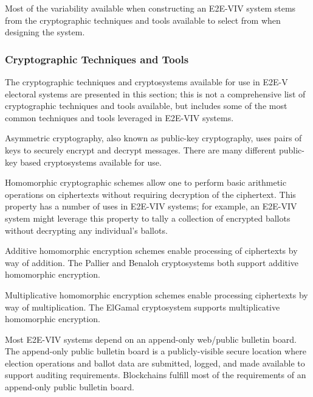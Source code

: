 Most of the variability available when constructing an E2E-VIV system stems from
the cryptographic techniques and tools available to select from when designing
the system.

\subsubsection{Cryptographic Techniques and Tools}
The cryptographic techniques and cryptosystems available for use in E2E-V
electoral systems are presented in this section; this is not a comprehensive
list of cryptographic techniques and tools available, but includes some of the
most common techniques and tools leveraged in E2E-VIV systems.

Asymmetric cryptography, also known as public-key cryptography, uses pairs of
keys to securely encrypt and decrypt messages. There are many different
public-key based cryptosystems available for use.

Homomorphic cryptographic schemes allow one to perform basic arithmetic
operations on ciphertexts without requiring decryption of the ciphertext. This
property has a number of uses in E2E-VIV systems; for example, an E2E-VIV system
might leverage this property to tally a collection of encrypted ballots without
decrypting any individual's ballots.

Additive homomorphic encryption schemes enable processing of ciphertexts by way
of addition. The Pallier and Benaloh cryptosystems both support additive
homomorphic encryption.\cite{helios}

Multiplicative homomorphic encryption schemes enable processing ciphertexts by
way of multiplication. The ElGamal cryptosystem supports multiplicative
homomorphic encryption.

Most E2E-VIV systems depend on an append-only web/public bulletin
board.\cite{bulletin-board} The append-only public bulletin board is a
publicly-visible secure location where election operations and ballot data are
submitted, logged, and made available to support auditing
requirements.\cite{e2e-viv,helios,almost-correct-mixing,pretty-good-democracy,mix-networks,vector-ballot-voting}
Blockchains fulfill most of the requirements of an append-only public bulletin
board.

